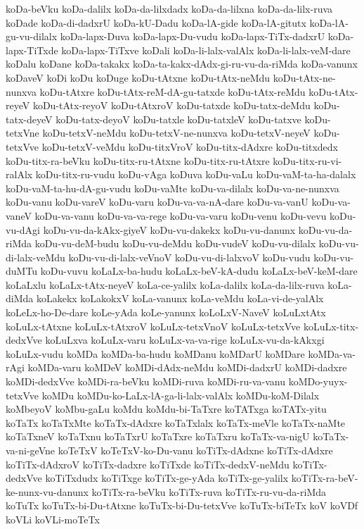 {koDa-beVku
koDa-dalilx
koDa-da-lilxdadx
koDa-da-lilxna
koDa-da-lilx-ruva
koDade
koDa-di-dadxrU
koDa-kU-Dadu
koDa-lA-gide
koDa-lA-gitutx
koDa-lA-gu-vu-dilalx
koDa-lapx-Duva
koDa-lapx-Du-vudu
koDa-lapx-TiTx-dadxrU
koDa-lapx-TiTxde
koDa-lapx-TiTxve
koDali
koDa-li-lalx-valAlx
koDa-li-lalx-veM-dare
koDalu
koDane
koDa-takakx
koDa-ta-kakx-dAdx-gi-ru-vu-da-riMda
koDa-vanunx
koDaveV
koDi
koDu
koDuge
koDu-tAtxne
koDu-tAtx-neMdu
koDu-tAtx-ne-nunxva
koDu-tAtxre
koDu-tAtx-reM-dA-gu-tatxde
koDu-tAtx-reMdu
koDu-tAtx-reyeV
koDu-tAtx-reyoV
koDu-tAtxroV
koDu-tatxde
koDu-tatx-deMdu
koDu-tatx-deyeV
koDu-tatx-deyoV
koDu-tatxle
koDu-tatxleV
koDu-tatxve
koDu-tetxVne
koDu-tetxV-neMdu
koDu-tetxV-ne-nunxva
koDu-tetxV-neyeV
koDu-tetxVve
koDu-tetxV-veMdu
koDu-titxVroV
koDu-titx-dAdxre
koDu-titxdedx
koDu-titx-ra-beVku
koDu-titx-ru-tAtxne
koDu-titx-ru-tAtxre
koDu-titx-ru-vi-ralAlx
koDu-titx-ru-vudu
koDu-vAga
koDuva
koDu-vaLu
koDu-vaM-ta-ha-dalalx
koDu-vaM-ta-hu-dA-gu-vudu
koDu-vaMte
koDu-va-dilalx
koDu-va-ne-nunxva
koDu-vanu
koDu-vareV
koDu-varu
koDu-va-va-nA-dare
koDu-va-vanU
koDu-va-vaneV
koDu-va-vanu
koDu-va-va-rege
koDu-va-varu
koDu-venu
koDu-vevu
koDu-vu-dAgi
koDu-vu-da-kAkx-giyeV
koDu-vu-dakekx
koDu-vu-danunx
koDu-vu-da-riMda
koDu-vu-deM-budu
koDu-vu-deMdu
koDu-vudeV
koDu-vu-dilalx
koDu-vu-di-lalx-veMdu
koDu-vu-di-lalx-veVnoV
koDu-vu-di-lalxvoV
koDu-vudu
koDu-vu-duMTu
koDu-vuvu
koLaLx-ba-hudu
koLaLx-beV-kA-dudu
koLaLx-beV-keM-dare
koLaLxlu
koLaLx-tAtx-neyeV
koLa-ce-yalilx
koLa-dalilx
koLa-da-lilx-ruva
koLa-diMda
koLakekx
koLakokxV
koLa-vanunx
koLa-veMdu
koLa-vi-de-yalAlx
koLeLx-ho-De-dare
koLe-yAda
koLe-yanunx
koLoLxV-NaveV
koLuLxtAtx
koLuLx-tAtxne
koLuLx-tAtxroV
koLuLx-tetxVnoV
koLuLx-tetxVve
koLuLx-titx-dedxVve
koLuLxva
koLuLx-varu
koLuLx-va-va-rige
koLuLx-vu-da-kAkxgi
koLuLx-vudu
koMDa
koMDa-ba-hudu
koMDanu
koMDarU
koMDare
koMDa-va-rAgi
koMDa-varu
koMDeV
koMDi-dAdx-neMdu
koMDi-dadxrU
koMDi-dadxre
koMDi-dedxVve
koMDi-ra-beVku
koMDi-ruva
koMDi-ru-va-vanu
koMDo-yuyx-tetxVve
koMDu
koMDu-ko-LaLx-lA-ga-li-lalx-valAlx
koMDu-koM-Dilalx
koMbeyoV
koMbu-gaLu
koMdu
koMdu-bi-TaTxre
koTATxga
koTATx-yitu
koTaTx
koTaTxMte
koTaTx-dAdxre
koTaTxlalx
koTaTx-meVle
koTaTx-naMte
koTaTxneV
koTaTxnu
koTaTxrU
koTaTxre
koTaTxru
koTaTx-va-nigU
koTaTx-va-ni-geVne
koTeTxV
koTeTxV-ko-Du-vanu
koTiTx-dAdxne
koTiTx-dAdxre
koTiTx-dAdxroV
koTiTx-dadxre
koTiTxde
koTiTx-dedxV-neMdu
koTiTx-dedxVve
koTiTxdudx
koTiTxge
koTiTx-ge-yAda
koTiTx-ge-yalilx
koTiTx-ra-beV-ke-nunx-vu-danunx
koTiTx-ra-beVku
koTiTx-ruva
koTiTx-ru-vu-da-riMda
koTuTx
koTuTx-bi-Du-tAtxne
koTuTx-bi-Du-tetxVve
koTuTx-biTeTx
koV
koVDf
koVLi
koVLi-moTeTx
}
